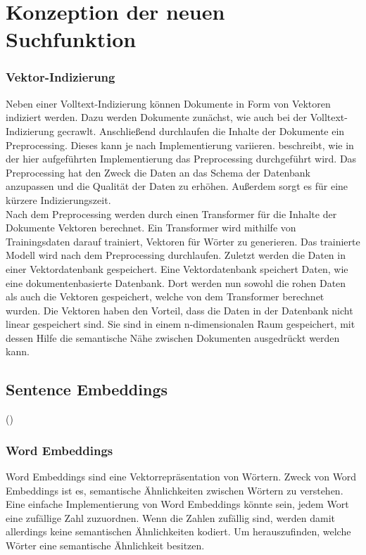\chapter{Konzeption der neuen Suchfunktion}
\label{chap:konzeption-der-suchfunktion}

\subsection{Vektor-Indizierung}
\label{chap:vektorindizes}
Neben einer Volltext-Indizierung können Dokumente in Form von Vektoren indiziert werden.
Dazu werden Dokumente zunächst, wie auch bei der Volltext-Indizierung gecrawlt.
Anschließend durchlaufen die Inhalte der Dokumente ein Preprocessing.
Dieses kann je nach Implementierung variieren.
 beschreibt, wie in der hier aufgeführten Implementierung das Preprocessing durchgeführt wird.
Das Preprocessing hat den Zweck die Daten an das Schema der Datenbank anzupassen und die Qualität der Daten zu erhöhen.
Außerdem sorgt es für eine kürzere Indizierungszeit.\\

Nach dem Preprocessing werden durch einen Transformer für die Inhalte der Dokumente Vektoren berechnet.
Ein Transformer wird mithilfe von Trainingsdaten darauf trainiert, Vektoren für Wörter zu generieren.
Das trainierte Modell wird nach dem Preprocessing durchlaufen.
Zuletzt werden die Daten in einer Vektordatenbank gespeichert.
Eine Vektordatenbank speichert Daten, wie eine dokumentenbasierte Datenbank.
Dort werden nun sowohl die rohen Daten als auch die Vektoren gespeichert, welche von dem Transformer berechnet wurden.
Die Vektoren haben den Vorteil, dass die Daten in der Datenbank nicht linear gespeichert sind.
Sie sind in einem n-dimensionalen Raum gespeichert, mit dessen Hilfe die semantische Nähe zwischen Dokumenten ausgedrückt werden kann.

\section{Sentence Embeddings}
 (\cite{Reimers_Gurevych_2019})

\subsection{Word Embeddings}
Word Embeddings sind eine Vektorrepräsentation von Wörtern.
Zweck von Word Embeddings ist es, semantische Ähnlichkeiten zwischen Wörtern zu verstehen.
Eine einfache Implementierung von Word Embeddings könnte sein, jedem Wort eine zufällige Zahl zuzuordnen.
Wenn die Zahlen zufällig sind, werden damit allerdings keine semantischen Ähnlichkeiten kodiert.
Um herauszufinden, welche Wörter eine semantische Ähnlichkeit besitzen.

